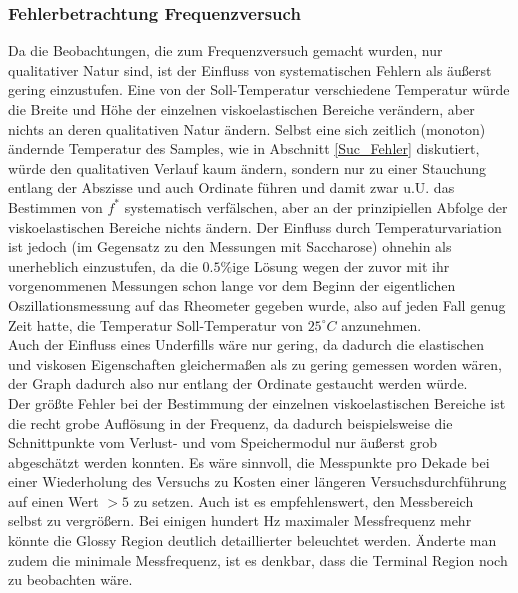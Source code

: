 \documentclass[11pt,a4paper,oneside]{scrartcl}
\begin{document}



\subsubsection{Fehlerbetrachtung Frequenzversuch}
Da die Beobachtungen, die zum Frequenzversuch gemacht wurden, nur qualitativer Natur sind, ist der Einfluss von systematischen Fehlern als äußerst gering einzustufen. Eine von der Soll-Temperatur verschiedene Temperatur würde die Breite und Höhe der einzelnen viskoelastischen Bereiche verändern, aber nichts an deren qualitativen Natur ändern. Selbst eine sich zeitlich (monoton) ändernde Temperatur des Samples, wie in Abschnitt \ref{Suc_Fehler} diskutiert, würde den qualitativen Verlauf kaum ändern, sondern nur zu einer Stauchung entlang der Abszisse und auch Ordinate führen und damit zwar u.U. das Bestimmen von $f^*$ systematisch verfälschen, aber an der prinzipiellen Abfolge der viskoelastischen Bereiche nichts ändern. Der Einfluss durch Temperaturvariation ist jedoch (im Gegensatz zu den Messungen mit Saccharose) ohnehin als unerheblich einzustufen, da die $0.5\%$ige Lösung wegen der zuvor mit ihr vorgenommenen Messungen schon lange vor dem Beginn der eigentlichen Oszillationsmessung auf das Rheometer gegeben wurde, also auf jeden Fall genug Zeit hatte, die Temperatur Soll-Temperatur von $25^\circ C$ anzunehmen.\\
  Auch der Einfluss eines Underfills wäre nur gering, da dadurch die elastischen und viskosen Eigenschaften gleichermaßen als zu gering gemessen worden wären, der Graph dadurch also nur entlang der Ordinate gestaucht werden würde. \\
Der größte Fehler bei der Bestimmung der einzelnen viskoelastischen Bereiche ist die recht grobe Auflösung in der Frequenz, da dadurch beispielsweise die Schnittpunkte vom Verlust- und vom Speichermodul nur äußerst grob abgeschätzt werden konnten. Es wäre sinnvoll, die Messpunkte pro Dekade bei einer Wiederholung des Versuchs zu Kosten einer längeren Versuchsdurchführung auf einen Wert $>5$ zu setzen. Auch ist es empfehlenswert, den Messbereich selbst zu vergrößern. Bei einigen hundert Hz maximaler Messfrequenz mehr könnte die Glossy Region deutlich detaillierter beleuchtet werden. Änderte man zudem die minimale Messfrequenz,  ist es denkbar, dass die Terminal Region noch zu beobachten wäre.\\
\end{document}
